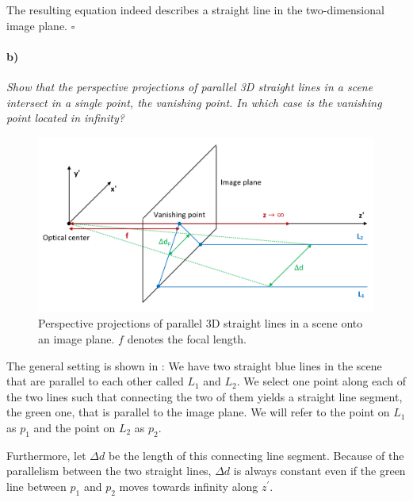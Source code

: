 \documentclass[a4paper,twocolumn]{article}
\newcommand{\subtask}[2]{\paragraph{#1)} \textit{#2} \newline}
\begin{document}
	The resulting equation indeed describes a straight line in the two-dimensional image plane. \hfill $\square$
	
	\subtask{b}{Show that the perspective projections of parallel 3D straight lines in a scene intersect in a single point, the vanishing point. In which case is the vanishing point located in infinity?}
	
	
	\begin{figure}
		\centering
		\includegraphics[width=\textwidth]{images/vanishing_point.png}
		\caption{Perspective projections of parallel 3D straight lines in a scene onto an image plane. $f$ denotes the focal length.}
		\label{fig:vanishing_point}
	\end{figure}
	
	
	The general setting is shown in : We have two straight blue lines in the scene that are parallel to each other called $L_1$ and $L_2$. We select one point along each of the two lines such that connecting the two of them yields a straight line segment, the green one, that is parallel to the image plane. We will refer to the point on $L_1$ as $p_1$ and the point on $L_2$ as $p_2$.
	
	Furthermore, let $\Delta d$ be the length of this connecting line segment. Because of the parallelism between the two straight lines, $\Delta d$ is always constant even if the green line between $p_1$ and $p_2$ moves towards infinity along $z^{\prime}$.
	
\end{document}
